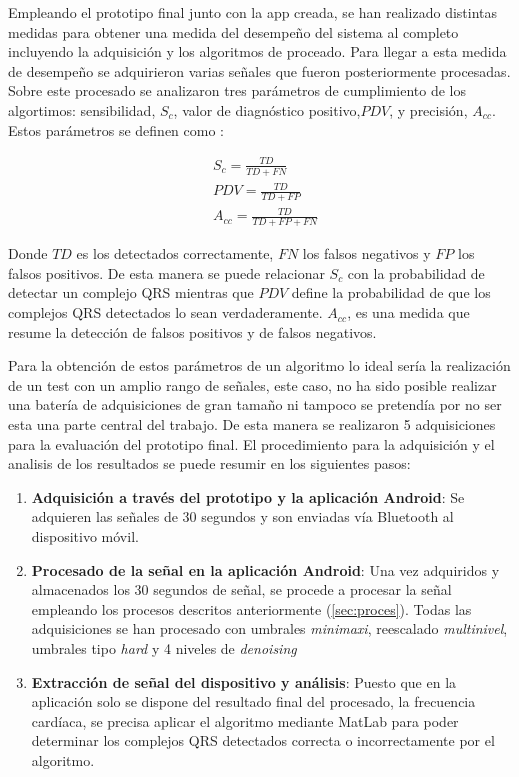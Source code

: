 Empleando el prototipo final junto con la app creada, se han realizado distintas medidas para obtener una medida del desempeño del sistema al completo incluyendo la adquisición y los algoritmos de proceado. Para llegar a esta medida de desempeño se adquirieron varias señales que fueron posteriormente procesadas. Sobre este procesado se analizaron tres parámetros de cumplimiento de los algortimos: sensibilidad, $S_c$, valor de diagnóstico positivo,$PDV$, y precisión, $A_{cc}$. Estos parámetros se definen como :

\begin{align}
&S_c =\frac{TD}{TD+FN} \\
&PDV =\frac{TD}{TD+FP}\\
&A_{cc}=\frac{TD}{TD+FP+FN} 
\end{align}

Donde $TD$ es los detectados correctamente, $FN$ los falsos negativos y $FP$ los falsos positivos. De esta manera se puede relacionar $S_c$ con la probabilidad de detectar un complejo QRS mientras que $PDV$ define la probabilidad de que los complejos QRS detectados lo sean verdaderamente. $A_{cc}$, es una medida que resume la detección de falsos positivos y de falsos negativos.  

Para la obtención de estos parámetros de un algoritmo lo ideal sería la realización de un test con un amplio rango de señales, este caso, no ha sido posible realizar una batería de adquisiciones de gran tamaño ni tampoco se pretendía por no ser esta una parte central del trabajo. De esta manera se realizaron 5 adquisiciones para la evaluación del prototipo final. El procedimiento para la adquisición y el analisis de los resultados se puede resumir en los siguientes pasos:

\begin{enumerate}
\item \textbf{Adquisición a través del prototipo y la aplicación Android}: Se adquieren las señales de 30 segundos y son enviadas vía Bluetooth al dispositivo móvil.

\item \textbf{Procesado de la señal en la aplicación Android}: Una vez adquiridos y almacenados los 30 segundos de señal, se procede a procesar la señal empleando los procesos descritos anteriormente (\autoref{sec:proces}). Todas las adquisiciones se han procesado con umbrales \textit{minimaxi}, reescalado \textit{multinivel}, umbrales tipo \textit{hard} y 4 niveles de \textit{denoising}

\item \textbf{Extracción de señal del dispositivo y análisis}: Puesto que en la aplicación solo se dispone del resultado final del procesado, la frecuencia cardíaca, se precisa aplicar el algoritmo mediante MatLab para poder determinar los complejos QRS detectados correcta o incorrectamente por el algoritmo.
\end{enumerate}

